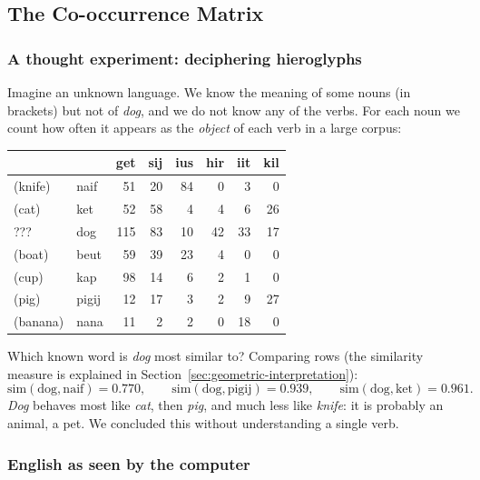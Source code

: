 \subsection{The Co-occurrence Matrix}
\label{sec:cooccurrence-matrix}

\subsubsection{A thought experiment: deciphering hieroglyphs}

Imagine an unknown language. We know the meaning of some nouns (in brackets) but not of
\emph{dog}, and we do not know any of the verbs. For each noun we count how often it
appears as the \emph{object} of each verb in a large corpus:

\begin{center}
\small
\begin{tabular}{@{}l l rrrrrr@{}}
\toprule
 & & \textbf{get} & \textbf{sij} & \textbf{ius} & \textbf{hir} & \textbf{iit} & \textbf{kil} \\
\midrule
(knife)  & naif  & 51  & 20 & 84 & 0  & 3  & 0  \\
(cat)    & ket   & 52  & 58 & 4  & 4  & 6  & 26 \\
???      & dog   & 115 & 83 & 10 & 42 & 33 & 17 \\
(boat)   & beut  & 59  & 39 & 23 & 4  & 0  & 0  \\
(cup)    & kap   & 98  & 14 & 6  & 2  & 1  & 0  \\
(pig)    & pigij & 12  & 17 & 3  & 2  & 9  & 27 \\
(banana) & nana  & 11  & 2  & 2  & 0  & 18 & 0  \\
\bottomrule
\end{tabular}
\end{center}

Which known word is \emph{dog} most similar to? Comparing rows (the similarity measure is
explained in Section~\ref{sec:geometric-interpretation}):
\[
  \text{sim}(\text{dog}, \text{naif}) = 0.770, \qquad
  \text{sim}(\text{dog}, \text{pigij}) = 0.939, \qquad
  \text{sim}(\text{dog}, \text{ket}) = 0.961.
\]
\emph{Dog} behaves most like \emph{cat}, then \emph{pig}, and much less like \emph{knife}:
it is probably an animal, a pet. We concluded this without understanding a single verb.

\subsubsection{English as seen by the computer}

